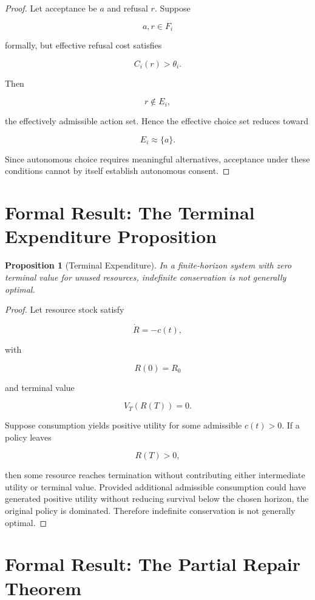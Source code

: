 \documentclass[11pt,oneside]{book}
\newtheorem{proposition}[theorem]{Proposition}
\theoremstyle{definition}
\theoremstyle{remark}
\begin{document}
\begin{proof}
Let acceptance be \(a\) and refusal \(r\). Suppose

\[
a,r\in F_i
\]

formally, but effective refusal cost satisfies

\[
C_i(r)>\theta_i.
\]

Then

\[
r\notin E_i,
\]

the effectively admissible action set. Hence the effective choice set reduces toward

\[
E_i\approx\{a\}.
\]

Since autonomous choice requires meaningful alternatives, acceptance under these conditions cannot by itself establish autonomous consent.
\end{proof}

\section{Formal Result: The Terminal Expenditure Proposition}

\begin{proposition}[Terminal Expenditure]
In a finite-horizon system with zero terminal value for unused resources, indefinite conservation is not generally optimal.
\end{proposition}

\begin{proof}
Let resource stock satisfy

\[
\dot R=-c(t),
\]

with

\[
R(0)=R_0
\]

and terminal value

\[
V_T(R(T))=0.
\]

Suppose consumption yields positive utility for some admissible \(c(t)>0\). If a policy leaves

\[
R(T)>0,
\]

then some resource reaches termination without contributing either intermediate utility or terminal value. Provided additional admissible consumption could have generated positive utility without reducing survival below the chosen horizon, the original policy is dominated. Therefore indefinite conservation is not generally optimal.
\end{proof}

\section{Formal Result: The Partial Repair Theorem}
\end{document}
